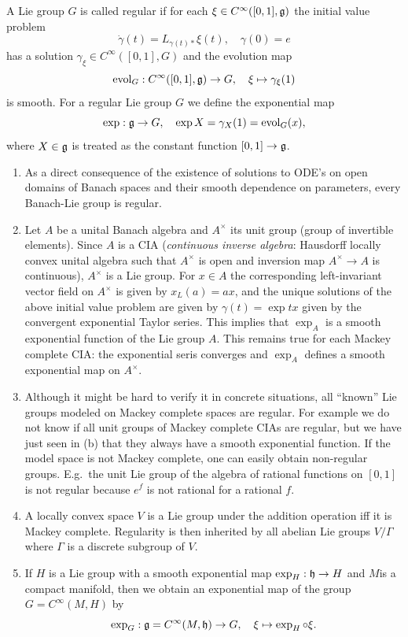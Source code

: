 \begin{defn}
    A Lie group $G$ is called regular if for each $\xi\in C^\infty([0,1],\mathfrak{g})$ the initial value problem
    \[\dot\gamma(t)=L_{\gamma(t)\ast}\xi(t),\quad \gamma(0)=e\]
    has a solution $\gamma_\xi\in C^\infty([0,1],G)$ and the evolution map 
    \[\mathrm{evol}_G:C^\infty([0,1],\mathfrak{g})\to G,\quad \xi\mapsto \gamma_\xi(1)\]
    is smooth. For a regular Lie group $G$ we define the exponential map
    \[\exp:\mathfrak{g}\to G,\quad \exp X=\gamma_X(1)=\mathrm{evol}_G(x),\]
    where $X\in\mathfrak{g}$ is treated as the constant function $[0,1]\to \mathfrak{g}$.
\end{defn}
\begin{rem}
    \begin{enumerate}[label=(\alph*)]
        \item As a direct consequence of the existence of solutions to ODE's on open domains of Banach spaces and their smooth dependence on parameters, every Banach-Lie group is regular.
        \item Let $A$ be a unital Banach algebra and $A^\times$ its unit group (group of invertible elements). Since $A$ is a CIA (\emph{continuous inverse algebra}: Hausdorff locally convex unital algebra such that $A^\times$ is open and inversion map $A^\times\to A$ is continuous), $A^\times$ is a Lie group. For $x\in A$ the corresponding left-invariant vector field on $A^\times$ is given by $x_L(a)=ax$, and the unique solutions of the above initial value problem are given by $\gamma(t)=\exp tx$ given by the convergent exponential Taylor series. This implies that $\exp_A$ is a smooth exponential function of the Lie group $A$. This remains true for each Mackey complete CIA: the exponential seris converges and $\exp_A$ defines a smooth exponential map on $A^\times$.
        \item Although it might be hard to verify it in concrete situations, all ``known'' Lie groups modeled on Mackey complete spaces are regular. For example we do not know if all unit groups of Mackey complete CIAs are regular, but we have just seen in (b) that they always have a smooth exponential function. If the model space is not Mackey complete, one can easily obtain non-regular groups. E.g.\ the unit Lie group of the algebra of rational functions on $[0,1]$ is not regular because $e^f$ is not rational for a rational $f$.
        \item A locally convex space $V$ is a Lie group under the addition operation iff it is Mackey complete. Regularity is then inherited by all abelian Lie groups $V\slash \Gamma$ where $\Gamma$ is a discrete subgroup of $V$.
        \item If $H$ is a Lie group with a smooth exponential map $\exp_H:\mathfrak{h}\to H$ and $M$is a compact manifold, then we obtain an exponential map of the group $G=C^\infty(M,H)$ by
        \[\exp_G:\mathfrak{g}=C^\infty(M,\mathfrak{h})\to G,\quad \xi\mapsto \exp_H\circ \xi.\]
    \end{enumerate}
\end{rem}

